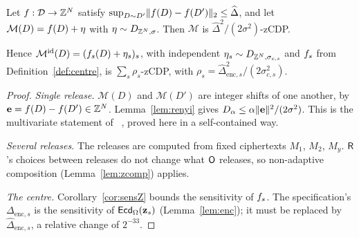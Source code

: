 \begin{proposition}\label{prop:ideal}
Let $f:\mathcal D\to\mathbb{Z}^N$ satisfy $\sup_{D\sim D'}\lVert f(D)-f(D')\rVert_2\le\widehat\Delta$, and let $\mathcal M(D)=f(D)+\eta$ with $\eta\sim D_{\mathbb{Z}^N,\sigma}$. Then $\mathcal M$ is $\widehat\Delta^2/(2\sigma^2)$-zCDP.

Hence $\mathcal M^{\mathrm{id}}(D)=(f_s(D)+\eta_s)_s$, with independent $\eta_s\sim D_{\mathbb{Z}^N,\sigma_{c,s}}$ and $f_s$ from Definition~\ref{def:centre}, is $\sum_s\rho_s$-zCDP, with $\rho_s=\widehat\Delta_{\mathrm{enc},s}^2/(2\sigma_{c,s}^2)$.
\end{proposition}
\begin{proof}
\emph{Single release.} $\mathcal M(D)$ and $\mathcal M(D')$ are integer shifts of one another, by $\mathbf e=f(D)-f(D')\in\mathbb{Z}^N$. Lemma~\ref{lem:renyi} gives $D_\alpha\le\alpha\lVert \mathbf e\rVert^2/(2\sigma^2)$. This is the multivariate statement of~\cite{CKS20} , proved here in a self-contained way.

\emph{Several releases.} The releases are computed from fixed ciphertexts $M_1$, $M_2$, $M_y$. $\mathsf{R}$'s choices between releases do not change what $\mathsf{O}$ releases, so non-adaptive composition (Lemma~\ref{lem:zcomp}) applies.

\emph{The centre.} Corollary~\ref{cor:sensZ} bounds the sensitivity of $f_s$. The specification's $\Delta_{\mathrm{enc},s}$ is the sensitivity of $\mathsf{Ecd}_\Omega(\mathbf z_s)$ (Lemma~\ref{lem:enc}); it must be replaced by $\widehat\Delta_{\mathrm{enc},s}$, a relative change of $2^{-33}$.
\end{proof}

